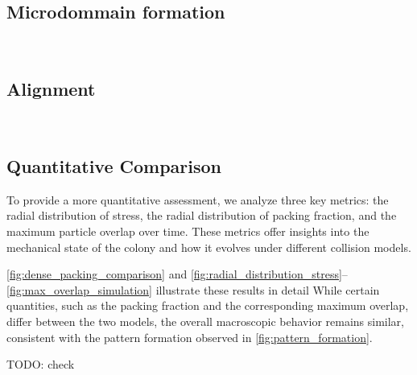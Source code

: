 \documentclass[conference]{IEEEtran}
\begin{document}
\subsection{Microdommain formation}

~\cite{You2018}


\subsection{Alignment}

~\cite{You_2021}


\subsection{Quantitative Comparison}

To provide a more quantitative assessment, we analyze three key metrics: the radial distribution of stress, the radial distribution of packing fraction, and the maximum particle overlap over time. These metrics offer insights into the mechanical state of the colony and how it evolves under different collision models.

\autoref{fig:dense_packing_comparison} and \autoref{fig:radial_distribution_stress}--\autoref{fig:max_overlap_simulation} illustrate these results in detail While certain quantities, such as the packing fraction and the corresponding maximum overlap, differ between the two models, the overall macroscopic behavior remains similar, consistent with the pattern formation observed in \autoref{fig:pattern_formation}.

TODO: check \cite{Warren2019}
\end{document}
